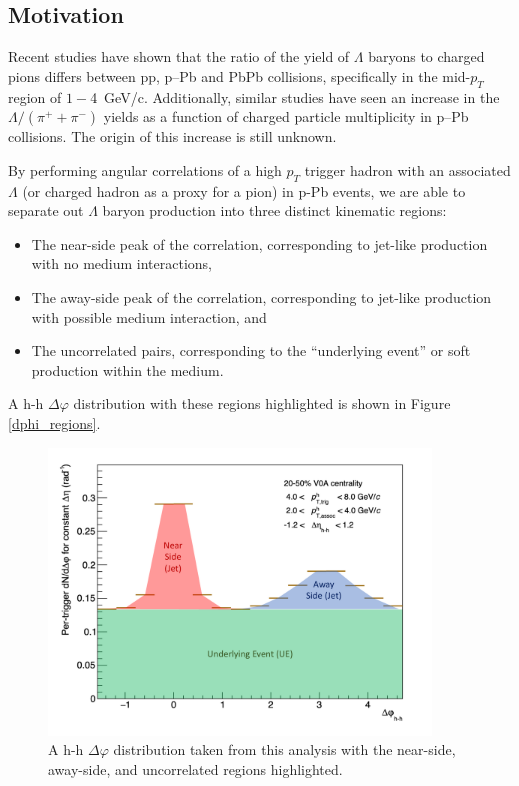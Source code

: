 \documentclass[ALICE,manyauthors]{ALICE_analysis_notes}
\begin{document}
\subsection{Motivation}
\label{motivation}
Recent studies have shown that the ratio of the yield of $\Lambda$ baryons to charged pions differs between pp, p--Pb and PbPb collisions, specifically in the mid-$p_T$ region of $1-$\SI{4}{GeV/c}.  Additionally, similar studies have seen an increase in the $\Lambda/(\pi^{+} + \pi^{-})$ yields as a function of charged particle multiplicity in p--Pb collisions. The origin of this increase is still unknown.

By performing angular correlations of a high $p_T$ trigger hadron with an associated $\Lambda$ (or charged hadron as a proxy for a pion) in p-Pb events, we are able to separate out $\Lambda$ baryon production into three distinct kinematic regions:
\begin{itemize}
\item The near-side peak of the correlation, corresponding to jet-like production with no medium interactions,
\item The away-side peak of the correlation, corresponding to jet-like production with possible medium interaction, and
\item The uncorrelated pairs, corresponding to the ``underlying event'' or soft production within the medium.
\end{itemize}

A h-h $\Delta\varphi$ distribution with these regions highlighted is shown in Figure \ref{dphi_regions}. 

\begin{figure}
\centering
\includegraphics[width=4in]{figures/dphi_regions.pdf}
\caption{A h-h $\Delta\varphi$ distribution taken from this analysis with the near-side, away-side, and uncorrelated regions highlighted.}
\end{figure}
\end{document}
